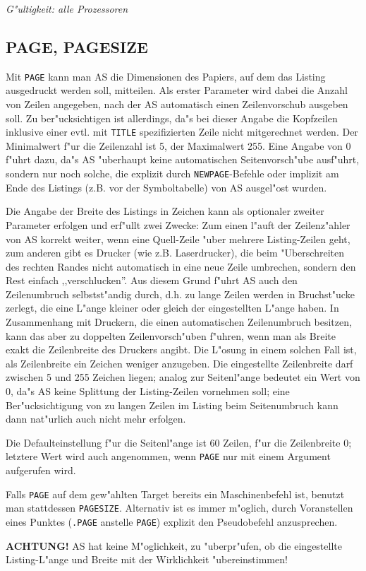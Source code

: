 \documentclass[12pt,a4paper,twoside]{report}
\makeatletter
\newcommand{\bb}[1]{{\bf #1}}
\newcommand{\tty}[1]{{\tt #1}}
\newcommand{\ttindex}[1]{\index{#1@{\tt #1}}}
\newcommand{\asname}{AS}
\makeatother
\begin{document}
{\em G"ultigkeit: alle Prozessoren}


\subsection{PAGE, PAGESIZE}
\label{SectPAGE}
\ttindex{PAGE}\ttindex{.PAGE}\ttindex{PAGESIZE}

Mit \tty{PAGE} kann man \asname{} die Dimensionen des Papiers, auf dem das
Listing ausgedruckt werden soll, mitteilen.  Als erster Parameter
wird dabei die Anzahl von Zeilen angegeben, nach der \asname{} automatisch
einen Zeilenvorschub ausgeben soll.  Zu ber"ucksichtigen ist allerdings,
da"s bei dieser Angabe die Kopfzeilen inklusive einer evtl. mit \tty{TITLE}
spezifizierten Zeile nicht mitgerechnet werden.  Der Minimalwert f"ur
die Zeilenzahl ist 5, der Maximalwert 255.  Eine Angabe von 0 f"uhrt dazu,
da"s \asname{} "uberhaupt keine automatischen Seitenvorsch"ube ausf"uhrt, sondern
nur noch solche, die explizit durch \tty{NEWPAGE}-Befehle oder implizit am
Ende des Listings (z.B. vor der Symboltabelle) von \asname{} ausgel"ost
wurden.
\par
Die Angabe der Breite des Listings in Zeichen kann als optionaler
zweiter Parameter erfolgen und erf"ullt zwei Zwecke: Zum einen l"auft
der Zeilenz"ahler von \asname{} korrekt weiter, wenn eine Quell-Zeile "uber mehrere
Listing-Zeilen geht, zum anderen gibt es Drucker (wie z.B. Laserdrucker),
die beim "Uberschreiten des rechten Randes nicht automatisch in eine neue
Zeile umbrechen, sondern den Rest einfach ,,verschlucken''.  Aus diesem
Grund f"uhrt \asname{} auch den Zeilenumbruch selbstst"andig durch, d.h. zu lange
Zeilen werden in Bruchst"ucke zerlegt, die eine L"ange kleiner oder
gleich der eingestellten L"ange haben.  In Zusammenhang mit Druckern, die
einen automatischen Zeilenumbruch besitzen, kann das aber zu doppelten
Zeilenvorsch"uben f"uhren, wenn man als Breite exakt die Zeilenbreite des
Druckers angibt.  Die L"osung in einem solchen Fall ist, als Zeilenbreite
ein Zeichen weniger anzugeben.  Die eingestellte Zeilenbreite darf zwischen
5 und 255 Zeichen liegen; analog zur Seitenl"ange bedeutet ein Wert von 0,
da"s \asname{} keine Splittung der Listing-Zeilen vornehmen soll; eine
Ber"ucksichtigung von zu langen Zeilen im Listing beim Seitenumbruch kann
dann nat"urlich auch nicht mehr erfolgen.
\par
Die Defaulteinstellung f"ur die Seitenl"ange ist 60 Zeilen, f"ur die
Zeilenbreite 0; letztere Wert wird auch angenommen, wenn \tty{PAGE} nur mit
einem Argument aufgerufen wird.
\par
Falls \tty{PAGE} auf dem gew"ahlten Target bereits ein Maschinenbefehl ist,
benutzt man stattdessen \tty{PAGESIZE}.  Alternativ ist es immer m"oglich,
durch Voranstellen eines Punktes (\tty{.PAGE} anstelle \tty{PAGE}) explizit
den Pseudobefehl anzusprechen.
\par
\bb{ACHTUNG!} \asname{} hat keine M"oglichkeit, zu "uberpr"ufen, ob die
eingestellte Listing-L"ange und Breite mit der Wirklichkeit "ubereinstimmen!
\end{document}
